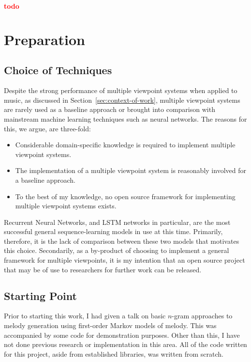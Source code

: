 \documentclass[12pt,a4paper,twoside,openright]{report}
\newcommand{\todo}{\textcolor{red}{\textbf{todo}~}}
\begin{document}
\todo

\chapter{Preparation}

\section{Choice of Techniques}

Despite the strong performance of multiple viewpoint systems when applied to
music, as discussed in Section~\ref{sec:context-of-work}, multiple viewpoint
systems are rarely used as a baseline approach or brought into comparison with
mainstream machine learning techniques such as neural networks. The reasons for
this, we argue, are three-fold:
\begin{itemize}
  \item Considerable domain-specific knowledge is required to implement multiple
    viewpoint systems.
  \item The implementation of a multiple viewpoint system is reasonably involved
    for a baseline approach.
  \item To the best of my knowledge, no open source framework for implementing
    multiple viewpoint systems exists.
\end{itemize}

Recurrent Neural Networks, and LSTM networks in particular, are the most
successful general sequence-learning models in use at this time. Primarily,
therefore, it is the lack of comparison between these two models that motivates
this choice. Secondarily, as a by-product of choosing to implement a general
framework for multiple viewpoints, it is my intention that an open source
project that may be of use to researchers for further work can be released.

\section{Starting Point}

Prior to starting this work, I had given a talk on basic $n$-gram approaches to
melody generation using first-order Markov models of melody. This was
accompanied by some code for demonstration purposes. Other than this, I have
not done previous research or implementation in this area. All of the code
written for this project, aside from established libraries, was written from
scratch.
\end{document}
